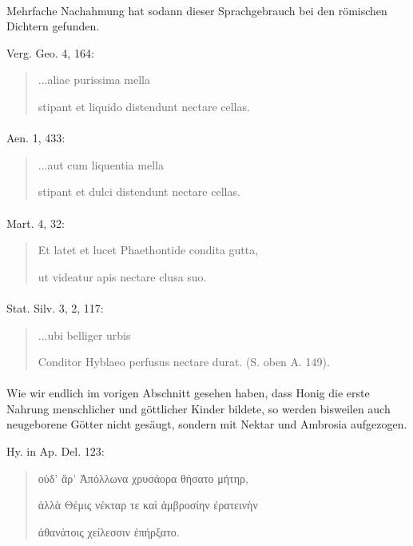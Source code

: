 \documentclass[a4paper, 11pt, oneside]{article}
\begin{document}
\paragraph{}
Mehrfache Nachahmung hat sodann dieser Sprachgebrauch bei den römischen Dichtern gefunden.

Verg. Geo. 4, 164:
\begin{quotation}
\hspace*{5mm}...aliae purissima mella

stipant et liquido distendunt nectare cellas.
\end{quotation}
\paragraph{}
Aen. 1, 433:
\begin{quotation}
\hspace*{5mm}...aut cum liquentia mella

stipant et dulci distendunt nectare cellas.
\end{quotation}
\paragraph{}
Mart. 4, 32:
\begin{quotation}
Et latet et lucet Phaethontide condita gutta,

ut videatur apis nectare clusa suo.
\end{quotation}
\paragraph{}
Stat. Silv. 3, 2, 117:
\begin{quotation}
\hspace*{5mm}...ubi belliger urbis

Conditor Hyblaeo perfusus nectare durat. (S. oben A. 149).
\end{quotation}
\paragraph{}
Wie wir endlich im vorigen Abschnitt gesehen haben, dass Honig die erste Nahrung menschlicher und göttlicher Kinder bildete, so werden bisweilen auch neugeborene Götter nicht gesäugt, sondern mit Nektar und Ambrosia aufgezogen.

Hy. in Ap. Del. 123:
\begin{quotation}
οὐδ' ἄρ' Ἀπόλλωνα χρυσάορα θήσατο μήτηρ,

ἀλλὰ Θέμις νέκταρ τε καὶ ἀμβροσίην ἐρατεινὴν

ἀθανάτοις χείλεσσιν ἐπήρξατο.
\end{quotation}
\end{document}
